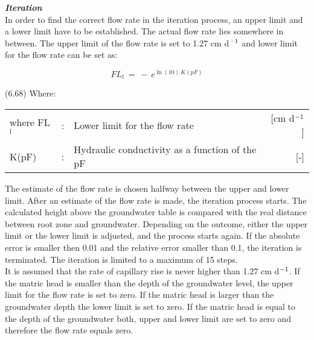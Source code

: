 {\bf {\it Iteration\/}}\\
In order to find the correct flow rate in the iteration process, an upper limit and a lower
limit have to be established. The actual flow rate lies somewhere in between. The upper
limit of the flow rate is set to 1.27 cm d$^{{\rm -1}}$ and lower limit for the flow rate can be set as:

\begin{equation}
FL _{l} ~=~ -\, e ^{\ln (10)\, K(pF)}
\end{equation}

 
\strut\hfill (6.68)
Where:\\
\begin{tabularx}{\textwidth}{llXr}



where FL$_{{\rm l}}$ &:& Lower limit for the flow rate  & [cm d$^{{\rm -1}}$]\\
K(pF) &:& Hydraulic conductivity as a function of the pF  & [-]
\end{tabularx}



The estimate of the flow rate is chosen halfway between the upper and lower limit. After
an estimate of the flow rate is made, the iteration process starts. The calculated height
above the groundwater table is compared with the real distance between root zone and
groundwater. Depending on the outcome, either the upper limit or the lower limit is
adjusted, and the process starts again. If the absolute error is smaller then 0.01 and the
relative error smaller than 0.1, the iteration is terminated. The iteration is limited to a
maximum of 15 steps. \\
It is assumed that the rate of capillary rise is never higher than 1.27 cm d$^{{\rm -1}}$. If the matric
head is smaller than the depth of the groundwater level, the upper limit for the flow rate
is set to zero. If the matric head is larger than the groundwater depth the lower limit is
set to zero. If the matric head is equal to the depth of the groundwater both, upper and
lower limit are set to zero and therefore the flow rate equals zero.


